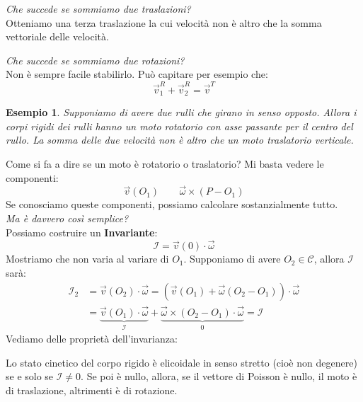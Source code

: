 \documentclass[11pt,a4paper,twoside]{article}
\newtheorem{es}{Esempio}
\theoremstyle{definition}
\begin{document}
\textit{Che succede se sommiamo due traslazioni?}\\
Otteniamo una terza traslazione la cui velocità non è altro che la somma vettoriale delle velocità.

\textit{Che succede se sommiamo due rotazioni?}\\
Non è sempre facile stabilirlo. Può capitare per esempio che:
\[ \vec v_1^R + \vec v_2^R = \vec v^T \]

\begin{es}
	Supponiamo di avere due rulli che girano in senso opposto. Allora i corpi rigidi dei rulli hanno un moto rotatorio con asse passante per il centro del rullo. La somma delle due velocità non è altro che un moto traslatorio verticale.
	\begin{center}
	\end{center}
\end{es}

Come si fa a dire se un moto è rotatorio o traslatorio? Mi basta vedere le componenti:
\[ \vec v(O_1) \qquad \vec \omega \times (P-O_1)\]
Se conosciamo queste componenti, possiamo calcolare sostanzialmente tutto.\\
\textit{Ma è davvero così semplice?}\\
Possiamo costruire un \textbf{Invariante}:
\[ \mathcal I = \vec v(0) \cdot \vec \omega \]
Mostriamo che non varia al variare di $O_1$. Supponiamo di avere $O_2 \in \mathscr C$, allora $\mathcal I$ sarà:
\begin{align*}
	\mathcal I_2 &= \vec v(O_2) \cdot \vec \omega = (\vec v(O_1) + \vec \omega(O_2-O_1)) \cdot \vec \omega\\
	&= \underbrace{\vec v(O_1) \cdot \vec \omega}_{\mathcal I} + \underbrace{\vec \omega\times(O_2 - O_1) \cdot \vec \omega}_{0} = \mathcal I
\end{align*}
Vediamo delle proprietà dell'invarianza:

\begin{prop}{}{}
	Lo stato cinetico del corpo rigido è elicoidale in senso stretto (cioè non degenere) se e solo se $\mathcal I\neq 0$. Se poi è nullo, allora, se il vettore di Poisson è nullo, il moto è di traslazione, altrimenti è di rotazione.
\end{prop}
\end{document}
